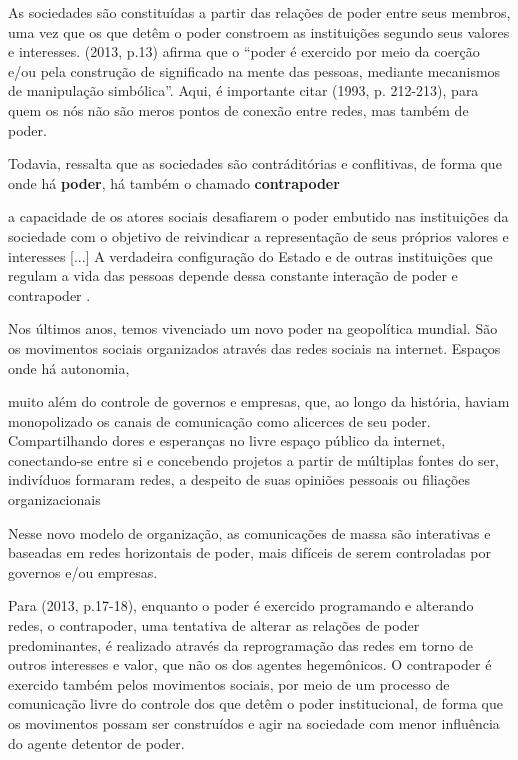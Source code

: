 As sociedades são constituídas a partir das relações de poder entre seus membros, uma vez que os que detêm o poder constroem as instituições segundo seus valores e interesses.  (2013, p.13) afirma que o “poder é exercido por meio da coerção e/ou pela construção de significado na mente das pessoas, mediante mecanismos de manipulação simbólica”.  Aqui, é importante citar  (1993, p. 212-213), para quem os nós não são meros pontos de conexão entre redes, mas também de poder.

Todavia,  ressalta que as sociedades são contráditórias e conflitivas, de forma que onde há \textbf{poder}, há também o chamado \textbf{contrapoder}

\begin{citacao}
a capacidade de os atores sociais desafiarem o poder embutido nas instituições da sociedade com o objetivo de reivindicar a representação de seus próprios valores e interesses [...] A verdadeira configuração do Estado e de outras instituições que regulam a vida das pessoas depende dessa constante interação de poder e contrapoder \cite[p .13]{castells2013}.
\end{citacao}

Nos últimos anos, temos vivenciado um novo poder na geopolítica mundial. São os movimentos sociais organizados através das redes sociais na internet. Espaços onde há autonomia,

\begin{citacao}
muito além do controle de governos e empresas, que, ao longo da história, haviam monopolizado os canais de comunicação como alicerces de seu poder. Compartilhando dores e esperanças no livre espaço público da internet, conectando-se entre si e concebendo projetos a partir de múltiplas fontes do ser, indivíduos formaram redes, a despeito de suas opiniões pessoais ou filiações organizacionais \cite[p .10]{castells2013}
\end{citacao}

Nesse novo modelo de organização, as comunicações de massa são interativas e baseadas em redes horizontais de poder, mais difíceis de serem controladas por governos e/ou empresas.

Para  (2013, p.17-18), enquanto o poder é exercido programando e alterando redes, o contrapoder, uma tentativa de alterar as relações de poder predominantes, é realizado através da reprogramação das redes em torno de outros interesses e valor, que não os dos agentes hegemônicos. O contrapoder é exercido também pelos movimentos sociais, por meio de um processo de comunicação livre do controle dos que detêm o poder institucional, de forma que os movimentos possam ser construídos e agir na sociedade com menor influência do agente detentor de poder. 

